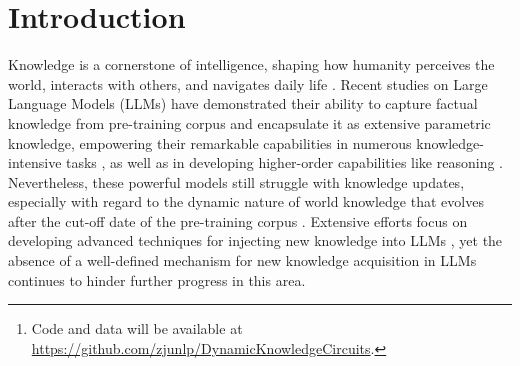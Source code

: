 \begin{abstract}
Despite exceptional capabilities in knowledge-intensive tasks, Large Language Models (LLMs) face a critical gap in understanding how they internalize new knowledge, particularly how to structurally embed acquired knowledge in their neural computations.
We address this issue through the lens of knowledge circuit evolution, identifying computational subgraphs that facilitate knowledge storage and processing.
Our systematic analysis of circuit evolution throughout continual pre-training reveals several key findings: 
(1) the acquisition of new knowledge is influenced by its relevance to pre-existing knowledge;
(2) the evolution of knowledge circuits exhibits a distinct phase shift from formation to optimization;
(3) the evolution of knowledge circuits follows a deep-to-shallow pattern.
These insights not only advance our theoretical understanding of the mechanisms of new knowledge acquisition in LLMs, but also provide potential implications for improving continual pre-training strategies to enhance model performance\footnote{Code and data will be available at \url{https://github.com/zjunlp/DynamicKnowledgeCircuits}.}.
\end{abstract}

\section{Introduction}

Knowledge is a cornerstone of intelligence, shaping how humanity perceives the world, interacts with others, and navigates daily life \citep{DBLP:conf/wsdm/Choi22,lkm}.
Recent studies \citep{gpt3,gpt4,llama3,deepseek_v3,qwen2.5,llm_survey,DBLP:journals/corr/abs-2401-10034} on Large Language Models (LLMs) have demonstrated their ability to capture factual knowledge from pre-training corpus and encapsulate it as extensive parametric knowledge, empowering their remarkable capabilities in numerous knowledge-intensive tasks \citep{knowledge_mechanisms_survey,knowledge_life_cycle}, as well as in developing higher-order capabilities like reasoning \citep{lm_prompt_reasoning_survey,llm_reasoning_survey}.
Nevertheless, these powerful models still struggle with knowledge updates, especially with regard to the dynamic nature of world knowledge that evolves after the cut-off date of the pre-training corpus \citep{DBLP:conf/emnlp/ZhangFCNW23,DBLP:journals/corr/abs-2404-08700}.
Extensive efforts focus on developing advanced techniques for injecting new knowledge into LLMs \citep{continual_knowledge_learning,pit,sft_injecting,DBLP:conf/emnlp/OvadiaBME24,DBLP:journals/corr/abs-2411-07175}, yet the absence of a well-defined mechanism for new knowledge acquisition in LLMs continues to hinder further progress in this area.

